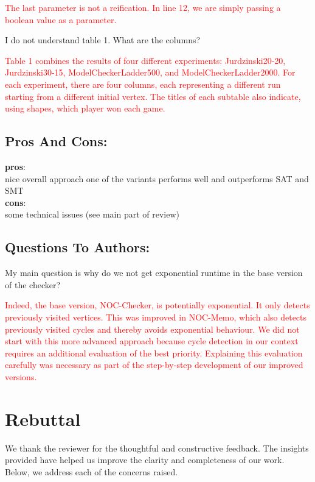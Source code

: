 \documentclass{article}
\begin{document}
\textcolor{red}{The last parameter is not a reification. In line 12, we are simply passing a boolean value as a parameter.}

I do not understand table 1. What are the columns?

\textcolor{red}{Table 1 combines the results of four different experiments: Jurdzinski20-20, Jurdzinski30-15, ModelCheckerLadder500, and ModelCheckerLadder2000. For each experiment, there are four columns, each representing a different run starting from a different initial vertex. The titles of each subtable also indicate, using shapes, which player won each game.}

\subsection*{Pros And Cons:}
\textbf{pros}:\\
nice overall approach
one of the variants performs well and outperforms SAT and SMT
\\
\textbf{cons}:\\
some technical issues (see main part of review)
\subsection*{Questions To Authors:}
My main question is why do we not get exponential runtime in the base version of the checker?

\textcolor{red}{Indeed, the base version, NOC-Checker, is potentially exponential. It only detects previously visited vertices. This was improved in NOC-Memo, which also detects previously visited cycles and thereby avoids exponential behaviour. We did not start with this more advanced approach because cycle detection in our context requires an additional evaluation of the best priority. Explaining this evaluation carefully was necessary as part of the step-by-step development of our improved versions.}


\section*{Rebuttal}

We thank the reviewer for the thoughtful and constructive feedback. The insights provided have helped us improve the clarity and completeness of our work. Below, we address each of the concerns raised.
\end{document}
